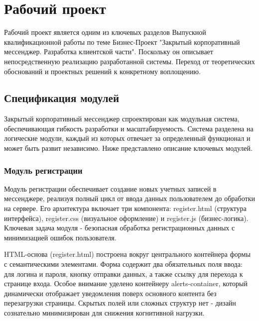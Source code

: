 	\section{Рабочий проект}
Рабочий проект является одним из ключевых разделов Выпускной квалификационной работы по теме Бизнес-Проект "Закрытый корпоративный мессенджер. Разработка клиентской части". Поскольку он описывает непосредственную реализацию разработанной системы. Переход от теоретических обоснований и проектных решений к конкретному воплощению.  
\subsection{Спецификация модулей}
Закрытый корпоративный мессенджер спроектирован как модульная система, обеспечивающая гибкость разработки и масштабируемость. Система разделена на логические модули, каждый из которых отвечает за определенный функционал и может быть развит независимо. Ниже представлено описание ключевых модулей.
\subsubsection{Модуль регистрации}
Модуль регистрации обеспечивает создание новых учетных записей в мессенджере, реализуя полный цикл от ввода данных пользователем до обработки на сервере. Его архитектура включает три компонента: register.html (структура интерфейса), register.css (визуальное оформление) и register.js (бизнес-логика). Ключевая задача модуля - безопасная обработка регистрационных данных с минимизацией ошибок пользователя.

HTML-основа (register.html) построена вокруг центрального контейнера формы с семантическими элементами. Форма содержит два обязательных поля ввода: для логина и пароля, кнопку отправки данных, а также ссылку для перехода к странице входа. Особое внимание уделено контейнеру alerts-container, который динамически отображает уведомления поверх основного контента без перезагрузки страницы. Скрытых полей или сложных структур нет - дизайн сознательно минимизирован для снижения когнитивной нагрузки.

